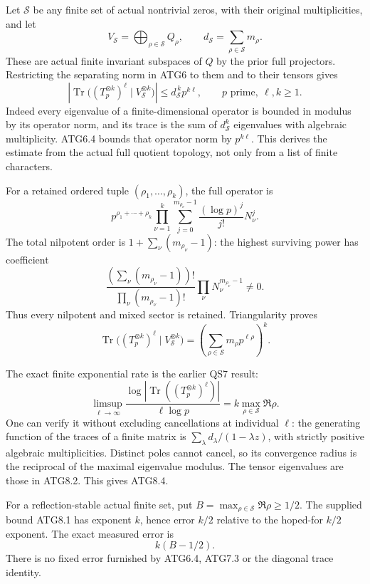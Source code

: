 Let \(\mathscr S\) be any finite set of actual nontrivial zeros, with
their original multiplicities, and let \[
V_{\mathscr S}=\bigoplus_{\rho\in\mathscr S}Q_\rho,\qquad
d_{\mathscr S}=\sum_{\rho\in\mathscr S}m_\rho.
\] These are actual finite invariant subspaces of \(Q\) by the prior
full projectors. Restricting the separating norm in ATG6 to them and to
their tensors gives \[
\left|\operatorname{Tr}\bigl((T_p^{\otimes k})^\ell
 \mid V_{\mathscr S}^{\otimes k}\bigr)\right|
 \le d_{\mathscr S}^{\,k}p^{k\ell},
\qquad p\text{ prime},\ \ell,k\ge1 .
\tag{ATG8.1}
\] Indeed every eigenvalue of a finite-dimensional operator is bounded
in modulus by its operator norm, and its trace is the sum of
\(d_{\mathscr S}^k\) eigenvalues with algebraic multiplicity. ATG6.4
bounds that operator norm by \(p^{k\ell}\). This derives the estimate
from the actual full quotient topology, not only from a list of finite
characters.

For a retained ordered tuple \((\rho_1,\ldots,\rho_k)\), the full
operator is \[
p^{\rho_1+\cdots+\rho_k}
 \prod_{\nu=1}^k\sum_{j=0}^{m_{\rho_\nu}-1}
 \frac{(\log p)^j}{j!}N_\nu^j.
\tag{ATG8.2}
\] The total nilpotent order is \(1+\sum_\nu(m_{\rho_\nu}-1)\): the
highest surviving power has coefficient \[
\frac{(\sum_\nu(m_{\rho_\nu}-1))!}
 {\prod_\nu(m_{\rho_\nu}-1)!}
 \prod_\nu N_\nu^{m_{\rho_\nu}-1}\ne0.
\] Thus every nilpotent and mixed sector is retained. Triangularity
proves \[
\operatorname{Tr}\bigl((T_p^{\otimes k})^\ell
 \mid V_{\mathscr S}^{\otimes k}\bigr)
 =\left(\sum_{\rho\in\mathscr S}m_\rho p^{\ell\rho}\right)^k.
\tag{ATG8.3}
\]

The exact finite exponential rate is the earlier QS7 result: \[
\limsup_{\ell\to\infty}
 \frac{\log|\operatorname{Tr}((T_p^{\otimes k})^\ell)|}{\ell\log p}
 =k\max_{\rho\in\mathscr S}\Re\rho.
\tag{ATG8.4}
\] One can verify it without excluding cancellations at individual
\(\ell\): the generating function of the traces of a finite matrix is
\(\sum_\lambda d_\lambda/(1-\lambda z)\), with strictly positive
algebraic multiplicities. Distinct poles cannot cancel, so its
convergence radius is the reciprocal of the maximal eigenvalue modulus.
The tensor eigenvalues are those in ATG8.2. This gives ATG8.4.

For a reflection-stable actual finite set, put
\(B=\max_{\rho\in\mathscr S}\Re\rho\ge1/2\). The supplied bound ATG8.1
has exponent \(k\), hence error \(k/2\) relative to the hoped-for
\(k/2\) exponent. The exact measured error is \[
k(B-1/2).
\tag{ATG8.5}
\] There is no fixed error furnished by ATG6.4, ATG7.3 or the diagonal
trace identity.

